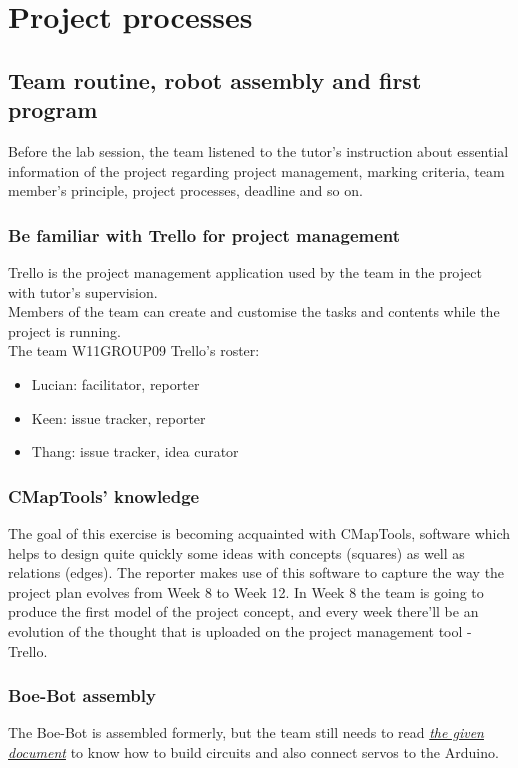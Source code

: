 \documentclass{article}
\begin{document}
\section{Project processes}

\subsection{Team routine, robot assembly and first program}
Before the lab session, the team listened to the tutor's instruction about essential information of the project regarding project management, marking criteria, team member's principle, project processes, deadline and so on.\\
\subsubsection{Be familiar with Trello for project management}
Trello is the project management application used by the team in the project with tutor's supervision. \\
Members of the team can create and customise the tasks and contents while the project is running.\\
The team W11GROUP09 Trello's roster:
\begin{itemize}
	\item Lucian: facilitator, reporter 
	\item Keen: issue tracker, reporter
	\item Thang: issue tracker, idea curator
\end{itemize}

\subsubsection{CMapTools' knowledge}
The goal of this exercise is becoming acquainted with CMapTools, software which helps to design quite quickly some ideas with concepts (squares) as well as relations (edges). The reporter makes use of this software to capture the way the project plan evolves from Week 8 to Week 12. In Week 8 the team is going to produce the first model of the project concept, and every week there'll be an evolution of the thought that is uploaded on the project management tool - Trello.


\subsubsection{Boe-Bot assembly}
The Boe-Bot is assembled formerly, but the team still needs to read  \href{https://canvas.sydney.edu.au/courses/5511/pages/Boe-Bot%20assembly?titleize=0}{\textit{the given document}} to know how to build circuits and also connect servos to the Arduino.
	
\end{document}

